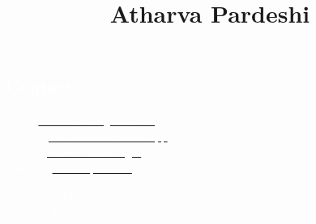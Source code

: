 \documentclass[11pt, oneside, a4paper, titlepage]{article}
\title{Atharva Pardeshi}
\date{}
\begin{document}
\begin{tcolorbox}
  \begin{minipage}{4.5cm}
    \subsection{\textcolor{white}{Contact}}
    \textcolor{white}{Email-}\href{mailto:atharva.exe@gmail.com}{\underline{\textcolor{white}{atharva.exe@gmail.com}}} \\
    \textcolor{white}{Website-}\href{https://atharvaworks.vercel.app}{\underline{\textcolor{white}{atharvaworks.vercel.app}}} \\
    \textcolor{white}{GitHub-}\href{https://github.com/SazedWorldbringer}{\underline{\textcolor{white}{SazedWorldbringer}}} \\
    \textcolor{white}{Linkedin-}\href{https://linkedin.com/in/atharvapardeshi}{\underline{\textcolor{white}{atharvapardeshi}}} \\
  \end{minipage}
  \begin{minipage}{15cm}
    \begin{center}
      \Huge{\textcolor{white}{Atharva Pardeshi}} \\
      \vspace*{0.5cm}
      \Large{\textcolor{white}{\textit{Software Developer}}}
    \end{center}
  \end{minipage}
\end{tcolorbox}
\end{document}
